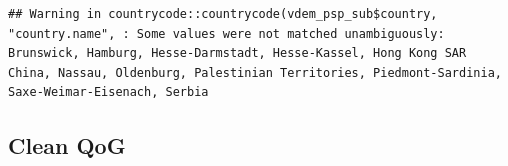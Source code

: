 \documentclass[
]{article}
\newenvironment{Shaded}{\begin{snugshade}}{\end{snugshade}}
\newcommand{\KeywordTok}[1]{\textcolor[rgb]{0.13,0.29,0.53}{\textbf{#1}}}
\newcommand{\NormalTok}[1]{#1}
\newcommand{\OperatorTok}[1]{\textcolor[rgb]{0.81,0.36,0.00}{\textbf{#1}}}
\newcommand{\StringTok}[1]{\textcolor[rgb]{0.31,0.60,0.02}{#1}}
\begin{document}
\begin{Shaded}
\end{Shaded}

\begin{verbatim}
## Warning in countrycode::countrycode(vdem_psp_sub$country, "country.name", : Some values were not matched unambiguously: Brunswick, Hamburg, Hesse-Darmstadt, Hesse-Kassel, Hong Kong SAR China, Nassau, Oldenburg, Palestinian Territories, Piedmont-Sardinia, Saxe-Weimar-Eisenach, Serbia
\end{verbatim}

\begin{Shaded}
\end{Shaded}

\hypertarget{clean-qog}{%
\subsection{Clean QoG}\label{clean-qog}}
\end{document}
